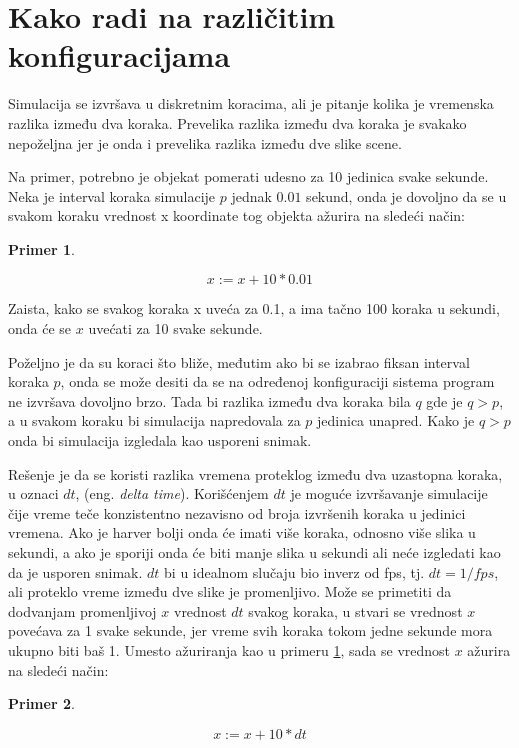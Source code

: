 \documentclass[12pt,oneside]{memoir}
\newtheorem{primer}{Primer}[section]
\begin{document}
\section{Kako radi na različitim konfiguracijama}

Simulacija se izvršava u diskretnim koracima, ali je pitanje kolika je vremenska razlika između dva koraka.
Prevelika razlika između dva koraka je svakako nepoželjna jer je onda i prevelika razlika između dve slike scene.

Na primer, potrebno je objekat pomerati udesno za 10 jedinica svake sekunde. Neka je interval koraka simulacije 
$p$ jednak $0.01$ sekund, onda je dovoljno da se u svakom koraku vrednost x koordinate tog objekta ažurira na sledeći način:

\begin{primer}
\label{pr:x}

$$ x:= x + 10 * 0.01 $$
\end{primer}

Zaista, kako se svakog koraka x uveća za 0.1, a ima tačno 100 koraka u sekundi, onda će se $x$ uvećati za 10 svake sekunde.

Poželjno je da su koraci što bliže, međutim ako bi se izabrao fiksan interval koraka $p$, onda se može desiti
da se na određenoj konfiguraciji sistema program ne izvršava dovoljno brzo. 
Tada bi razlika između dva koraka bila $q$ gde je $q > p$, a u svakom koraku bi simulacija napredovala za 
$p$ jedinica unapred. Kako je $q > p$ onda bi simulacija izgledala kao usporeni snimak.

Rešenje je da se koristi razlika vremena proteklog između dva uzastopna koraka, u oznaci $dt$, (eng. {\em delta time}).
Korišćenjem $dt$ je moguće izvršavanje simulacije čije vreme teče konzistentno nezavisno od broja izvršenih koraka u 
jedinici vremena. Ako je harver bolji onda će imati više koraka, odnosno više slika u sekundi, a ako je 
sporiji onda će biti manje slika u sekundi ali neće izgledati kao da je usporen snimak.
$dt$ bi u idealnom slučaju bio inverz od fps, tj. $dt = 1/fps$, ali proteklo vreme između dve slike je promenljivo.
Može se primetiti da dodvanjam promenljivoj $x$ vrednost $dt$ svakog koraka, u stvari se vrednost $x$ povećava 
za 1 svake sekunde, jer vreme svih koraka tokom jedne sekunde mora ukupno biti baš 1.
Umesto ažuriranja kao u primeru \ref{pr:x}, sada se vrednost $x$ ažurira na sledeći način:
\begin{primer}
	\label{pr:x2}
	
	$$ x:= x + 10 * dt $$
\end{primer}
\end{document}
